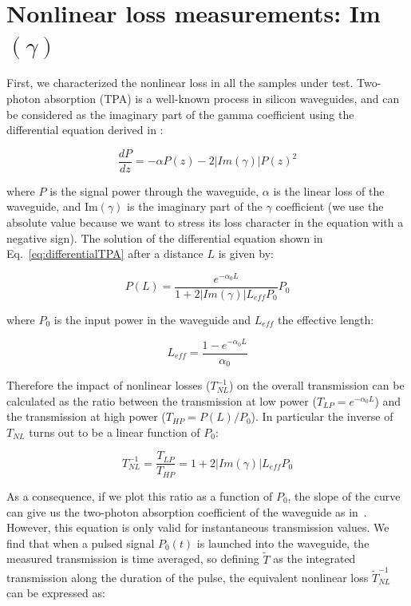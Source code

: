 \documentclass[10pt,letterpaper]{article}
\begin{document}
\section{Nonlinear loss measurements: Im$ (\gamma) $}
\label{sec:imGamma}
First, we characterized the nonlinear loss in all the samples under test. Two-photon absorption (TPA) is a well-known process in silicon waveguides, and can be considered as the imaginary part of the gamma coefficient using the differential equation derived in \cite{Mizrahi}:

\begin{equation}
\frac{dP}{dz} = -\alpha P(z) - 2|Im(\gamma)| P(z)^2 
\label{eq:differentialTPA}
\end{equation}

where $P$ is the signal power through the waveguide, $\alpha$ is the linear loss of the waveguide, and Im$(\gamma)$ is the imaginary part of the $\gamma$ coefficient (we use the absolute value because we want to stress its loss character in the equation with a negative sign). 
The solution of the differential equation shown in Eq.~\ref{eq:differentialTPA} after a distance $L$ is given by:

\begin{equation}
P(L) = \frac{e^{-\alpha_0 L}}{1+2|Im(\gamma)| L_{eff} P_0} P_0
\end{equation}

where $P_0$ is the input power in the waveguide and $ L_{eff} $ the effective length:

\begin{equation}
L_{eff} = \frac{1-e^{-\alpha_0L}}{\alpha_0}
\end{equation}


Therefore the impact of nonlinear losses ($T_{NL}^{-1}$) on the overall transmission can be calculated as the ratio between the transmission at low power ($T_{LP} = e^{-\alpha_0 L} $) and the transmission at high power ($T_{HP} = P(L)/P_0 $). In particular the inverse of $T_{NL}$ turns out to be a linear function of $P_0$:

\begin{equation}
T_{NL}^{-1} = \frac{T_{LP}}{T_{HP}} = 1+2|Im(\gamma)| L_{eff} P_0
\label{eq:transmissionLinear}
\end{equation}

As a consequence, if we plot this ratio as a function of $P_0$, the slope of the curve can give us the two-photon absorption coefficient of the waveguide as in~\cite{Vallaitis2009}.
However, this equation is only valid for instantaneous transmission values. We find that when a pulsed signal $P_0(t)$ is launched into the waveguide, the measured transmission is time averaged, so defining $ \tilde{T} $ as the integrated transmission along the duration of the pulse, the equivalent nonlinear loss $\tilde{T}_{NL}^{-1}$ can be expressed as:
\end{document}
